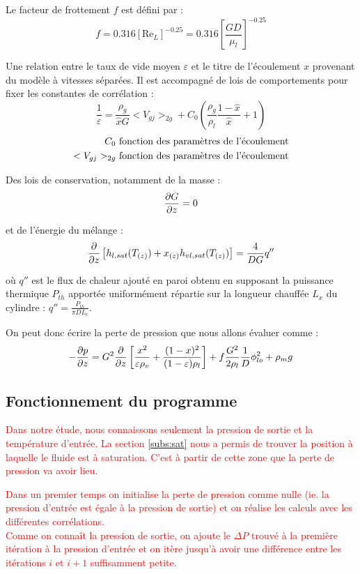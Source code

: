Le facteur de frottement $f$ est défini par :
\begin{equation}
    f = 0.316 \left[\text{Re}_L\right]^{-0.25} = 0.316 \left[\frac{G D}{\mu_l}\right]^{-0.25} 
\end{equation}

Une relation entre le taux de vide moyen $\varepsilon$ et le titre de l'écoulement $x$ provenant du modèle à vitesses séparées. Il est accompagné de lois de comportements pour fixer les constantes de corrélation :
\begin{equation}
        \frac{1}{\varepsilon} = \frac{\rho_g}{\hat{x} G} <V_{gj}>_{2g} + C_0\left(\frac{\rho_g}{\rho_l}\frac{1-\hat{x}}{\hat{x}} + 1\right) 
\end{equation}
\begin{align*}
         C_0 &\textnormal{ fonction des paramètres de l'écoulement}\\
        <V_{gj}>_{2g} &\textnormal{ fonction des paramètres de l'écoulement}   
\end{align*}

Des lois de conservation, notamment de la masse :
\begin{equation}
    \pder[G]{z} = 0
\end{equation}

et de l'énergie du mélange :
\begin{equation}
    \pder{z} \left[ h_{l,sat}(T_{(z)})+x_{(z)}h_{vl,sat}(T_{(z)})\right] = \frac{4}{DG}q''
\end{equation}

où $q''$ est le flux de chaleur ajouté en paroi obtenu en supposant la puissance thermique $P_{th}$ apportée uniformément répartie sur la longueur chauffée $L_x$ du cylindre : $q'' = \frac{P_{th}}{\pi DL_c}$.\\ \par
On peut donc écrire la perte de pression que nous allons évaluer comme :
\begin{equation}
     -\pder[p]{z} = G^2\pder{z}\left[\frac{x^{2}}{\varepsilon \rho_{v}}+\frac{(1-x)^{2}}{(1-\varepsilon) \rho_{l}} \right] + f\frac{G^2}{2 \rho_l}\frac{1}{D} \phi_{lo}^2 + \rho_m g
\end{equation}

\subsection{Fonctionnement du programme}
\textcolor{red}{Dans notre étude, nous connaissons seulement la pression de sortie et la température d'entrée. La section \ref{subs:sat} nous a permis de trouver la position à laquelle le fluide est à saturation. C'est à partir de cette zone que la perte de pression va avoir lieu.} \\ \par
\textcolor{red}{Dans un premier temps on initialise la perte de pression comme nulle (ie. la pression d'entrée est égale à la pression de sortie) et on réalise les calculs avec les différentes corrélations.} \\
\textcolor{red}{Comme on connaît la pression de sortie, on ajoute le $\Delta P$ trouvé à la première itération à la pression d'entrée et on itère jusqu'à avoir une différence entre les itérations $i$ et $i+1$ suffisamment petite.}